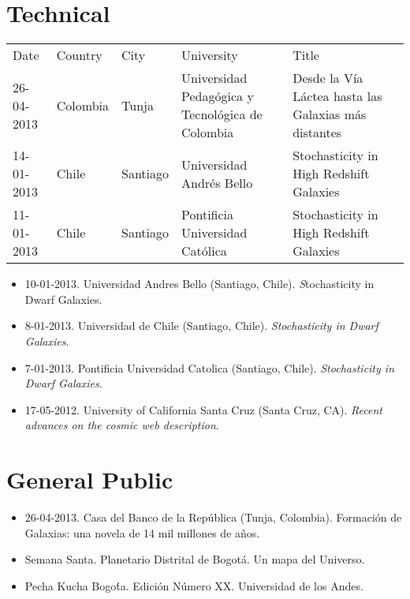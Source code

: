 \documentclass{report}
\begin{document}
\section*{Technical}
\begin{tabular}{p{2.0cm} p{1.5cm} p{1.5cm} p{2cm} p{5cm}}
Date & Country & City& University & Title\\
26-04-2013 & Colombia & Tunja & Universidad Pedag\'ogica y
Tecnol\'ogica de Colombia & Desde la V\'ia L\'actea hasta las Galaxias
m\'as distantes\\
14-01-2013 & Chile & Santiago  & Universidad Andr\'es Bello &
Stochasticity in High Redshift Galaxies\\
11-01-2013 & Chile & Santiago  & Pontificia Universidad Cat\'olica&
Stochasticity in High Redshift Galaxies\\

\end{tabular}
\begin{itemize}

\item 10-01-2013. Universidad Andres Bello (Santiago, Chile). {\textit
  Stochasticity in Dwarf Galaxies}.
\item 8-01-2013. Universidad de Chile (Santiago, Chile). {\it Stochasticity
  in Dwarf Galaxies}. 
\item 7-01-2013. Pontificia Universidad Catolica (Santiago,
  Chile). {\it Stochasticity in Dwarf Galaxies}.
\item 17-05-2012. University of California Santa Cruz (Santa Cruz,
  CA). {\it Recent advances on the cosmic web description}.
\end{itemize}

\section*{General Public}
\begin{itemize}
\item 26-04-2013. Casa del Banco de la Rep\'ublica (Tunja,
  Colombia). Formaci\'on de Galaxias: una novela de 14 mil millones de
  a\~nos.  
\item Semana Santa. Planetario Distrital de Bogot\'a. Un mapa del Universo.
\item Pecha Kucha Bogo\'ta. Edici\'on N\'umero XX. Universidad de los Andes.
\end{itemize}
\end{document}
